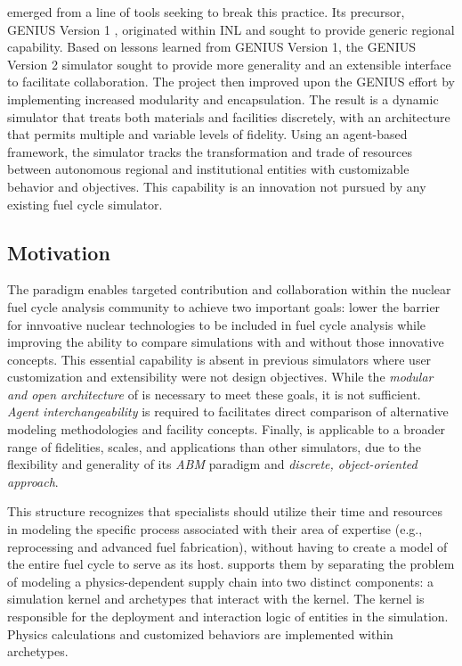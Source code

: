 \Cyclus emerged from a line of tools seeking to break this practice.  Its
precursor, \gls{GENIUS} Version 1
\cite{dunzik-gougar_global_2007,jain_transitioning_2006}, originated within
\gls{INL} and sought to provide generic regional capability.  Based on lessons
learned from \gls{GENIUS} Version 1, the \gls{GENIUS} Version 2
\cite{oliver_studying_2009,huff_geniusv2_2009} simulator sought to provide more
generality and an extensible interface to facilitate collaboration.  The \Cyclus
project then improved upon the \gls{GENIUS} effort by implementing increased
modularity and encapsulation.  The result is a dynamic simulator that treats
both materials and facilities discretely, with an architecture that permits
multiple and variable levels of fidelity. Using an agent-based framework, the
simulator tracks the transformation and trade of resources between autonomous
regional and institutional entities with customizable behavior and
objectives. This capability is an innovation not pursued by any existing fuel
cycle simulator.


\subsection{Motivation}

The \Cyclus paradigm enables targeted contribution and collaboration within the
nuclear fuel cycle analysis community to achieve two important goals: lower the
barrier for innvoative nuclear technologies to be included in fuel cycle analysis 
while improving the ability to compare simulations with and without those innovative
concepts.  This essential capability is absent in
previous simulators where user customization and extensibility were not design
objectives.  While the \emph{modular and open architecture} of
\Cyclus is necessary to meet these goals, it is not sufficient.  
\emph{Agent interchangeability} is required to facilitates direct comparison 
of alternative modeling methodologies and facility concepts.  Finally, \Cyclus is
applicable to a broader range of fidelities, scales, and applications than
other simulators, due to the flexibility and generality of its
\emph{\gls{ABM}} paradigm and \emph{discrete, object-oriented approach}.

This structure recognizes that specialists should utilize their time and
resources in modeling the specific process associated with their area of
expertise (e.g., reprocessing and advanced fuel fabrication), without having to
create a model of the entire fuel cycle to serve as its host.  \Cyclus supports
them by separating the problem of modeling a physics-dependent supply chain
into two distinct components: a simulation kernel and archetypes that interact
with the kernel. The kernel is responsible for the deployment and interaction
logic of entities in the simulation.  Physics calculations and customized
behaviors are implemented within archetypes.

